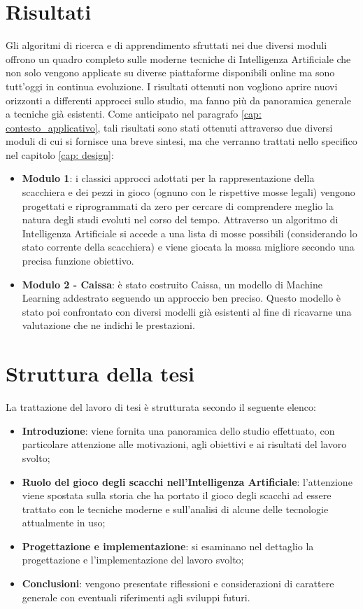 \section{Risultati}
Gli algoritmi di ricerca e di apprendimento sfruttati nei due diversi moduli offrono un quadro completo sulle moderne tecniche di Intelligenza
Artificiale che non solo vengono applicate su diverse piattaforme disponibili online ma sono tutt'oggi in continua evoluzione. 
I risultati ottenuti non vogliono aprire nuovi orizzonti a differenti approcci sullo studio, 
ma fanno più da panoramica generale a tecniche già esistenti. Come anticipato nel paragrafo \ref{cap: contesto_applicativo}, tali risultati sono stati ottenuti attraverso due diversi moduli di cui si fornisce una breve sintesi, ma che verranno trattati nello specifico nel capitolo \ref{cap: design}:
\begin{itemize}
    \item \textbf{Modulo 1}: i classici approcci adottati per la rappresentazione della scacchiera e dei pezzi in gioco (ognuno con le rispettive mosse legali) vengono progettati e riprogrammati da zero per cercare di comprendere meglio la natura degli studi evoluti nel corso del tempo. Attraverso un algoritmo di Intelligenza Artificiale si accede a una lista di mosse possibili (considerando lo stato corrente della scacchiera) e viene giocata la mossa migliore secondo una precisa funzione obiettivo.
    \item \textbf{Modulo 2 - Caissa}: è stato costruito Caissa, un modello di Machine Learning addestrato seguendo un approccio ben preciso. Questo modello è stato poi confrontato con diversi modelli già esistenti al fine di ricavarne una valutazione che ne indichi le prestazioni. 
\end{itemize}
\newpage
\section{Struttura della tesi}
La trattazione del lavoro di tesi è strutturata secondo il seguente elenco:
\begin{itemize}
    \item \textbf{Introduzione}: viene fornita una panoramica dello studio effettuato, con particolare attenzione alle motivazioni, 
    agli obiettivi e ai risultati del lavoro svolto;
    \item \textbf{Ruolo del gioco degli scacchi nell'Intelligenza Artificiale}: l'attenzione viene spostata sulla storia che ha portato il gioco degli scacchi ad essere trattato con le tecniche moderne e sull'analisi di alcune delle tecnologie attualmente in uso;
    \item \textbf{Progettazione e implementazione}: si esaminano nel dettaglio la progettazione e l'implementazione del lavoro svolto;
    \item \textbf{Conclusioni}: vengono presentate riflessioni e considerazioni di carattere generale con eventuali riferimenti agli sviluppi futuri.
\end{itemize}
